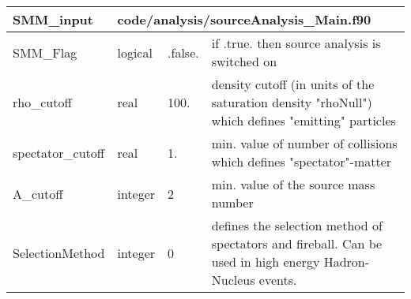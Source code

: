 \documentclass{article}
\begin{document}

\begin{longtable}{llll}
\toprule
\textbf{\large{SMM\_input}} & \multicolumn{3}{l}{\footnotesize{code/analysis/sourceAnalysis\_Main.f90}}\\*
\midrule
\endfirsthead
\midrule
\endhead
SMM\_Flag & \begin{minipage}[t]{2cm}logical\end{minipage} & \begin{minipage}[t]{2cm}.false.\end{minipage} & \begin{minipage}[t]{12cm}if .true. then source analysis is switched on\end{minipage}\\*
\midrule
rho\_cutoff & \begin{minipage}[t]{2cm}real\end{minipage} & \begin{minipage}[t]{2cm}100.\end{minipage} & \begin{minipage}[t]{12cm}density cutoff (in units of the saturation density "rhoNull") which defines "emitting" particles\end{minipage}\\*
\midrule
spectator\_cutoff & \begin{minipage}[t]{2cm}real\end{minipage} & \begin{minipage}[t]{2cm}1.\end{minipage} & \begin{minipage}[t]{12cm}min. value of number of collisions which defines "spectator"-matter\end{minipage}\\*
\midrule
A\_cutoff & \begin{minipage}[t]{2cm}integer\end{minipage} & \begin{minipage}[t]{2cm}2\end{minipage} & \begin{minipage}[t]{12cm}min. value of the source mass number\end{minipage}\\*
\midrule
SelectionMethod & \begin{minipage}[t]{2cm}integer\end{minipage} & \begin{minipage}[t]{2cm}0\end{minipage} & \begin{minipage}[t]{12cm}defines the selection method of spectators and fireball. Can be used in high energy Hadron-Nucleus events.\end{minipage}\\*

\end{longtable}
\end{document}
